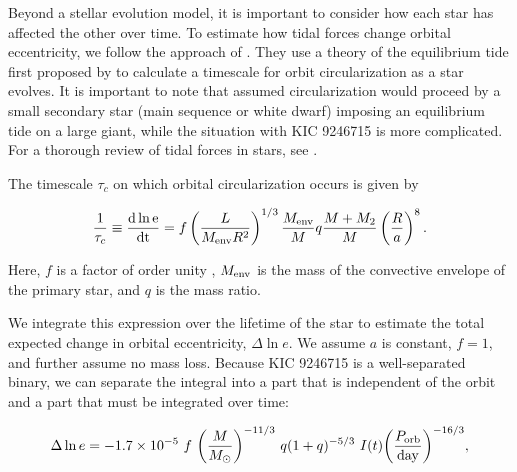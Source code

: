 Beyond a stellar evolution model, it is important to consider how each star has affected the other over time. To estimate how tidal forces change orbital eccentricity, we follow the approach of \citet{ver95}. They use a theory of the equilibrium tide first proposed by \citet{zah77} to calculate a timescale for orbit circularization as a star evolves. It is important to note that \citet{ver95} assumed circularization would proceed by a small secondary star (main sequence or white dwarf) imposing an equilibrium tide on a large giant, while the situation with KIC 9246715 is more complicated. For a thorough review of tidal forces in stars, see \citet{ogi14}.

The timescale $\tau_c$ on which orbital circularization occurs is given by

\begin{equation}
\frac{1}{\tau_c} \equiv \frac{\rm{d} \ln e}{\rm{d}t} = f \left( \frac{L}{M_{\rm{env}}R^2} \right)^{1/3} \frac{M_{\rm{env}}}{M} q \frac{M+M_2}{M} \left( \frac{R}{a} \right)^8.
\end{equation}

Here, $f$ is a factor of order unity \citep{ver95}, $M_{\rm{env}}$ is the mass of the convective envelope of the primary star, and $q$ is the mass ratio.

We integrate this expression over the lifetime of the star to estimate the total expected change in orbital eccentricity, $\Delta \ln e$. We assume $a$ is constant, $f = 1$, and further assume no mass loss. Because KIC 9246715 is a well-separated binary, we can separate the integral into a part that is independent of the orbit and a part that must be integrated over time:




\begin{equation}\label{tide1}
\Delta \ln e = -1.7 \times 10^{-5} \ f \ {\left( \frac{M}{M_{\odot}} \right)}^{-11/3} \ q(1+q)^{-5/3} \ I(t) {\left( \frac{P_{\rm{orb}}}{\rm{day}} \right)}^{-16/3},
\end{equation}

